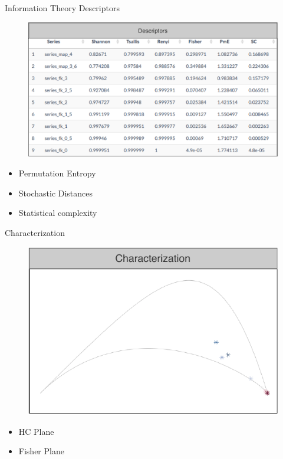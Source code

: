 \documentclass[10pt]{beamer}
\begin{document}
\begin{frame}{Information Theory Descriptors}

    \begin{figure}
       \includegraphics[scale = 0.5]{Figures/Descriptors.pdf}
    \end{figure}

    \begin{itemize}
        \item Permutation Entropy
        \item Stochastic Distances
        \item Statistical complexity
    \end{itemize}

\end{frame}


\begin{frame}{Characterization}

    \begin{figure}
      \centering
       \includegraphics[scale = 0.8]{Figures/Characterization.pdf}
    \end{figure}

    \begin{itemize}
        \item HC Plane
        \item Fisher Plane
    \end{itemize}
\end{frame}
\end{document}
